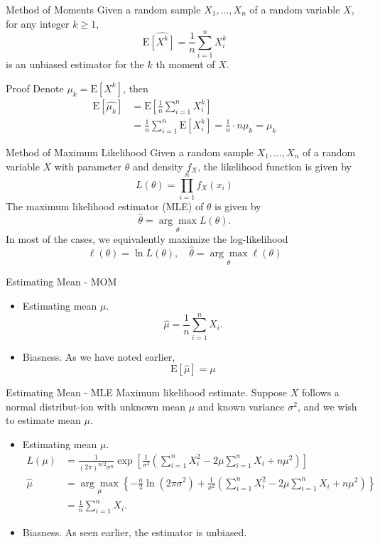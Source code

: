 \documentclass{beamer}
\begin{document}
\begin{frame}{Method of Moments}
Given a random sample $X_{1}, \ldots, X_{n}$ of a random variable $X$, for any integer $k \geq 1$,
$$
\mathrm{E}\widehat{\left[X^{k}\right]}=\frac{1}{n} \sum_{i=1}^{n} X_{i}^{k}
$$
is an unbiased estimator for the $k$ th moment of $X$.
\begin{block}{Proof}
Denote $\mu_{k}=\mathrm{E}\left[X^{k}\right]$, then
$$
\begin{aligned}
\mathrm{E}\left[\widehat{\mu_{k}}\right] &=\mathrm{E}\left[\frac{1}{n} \sum_{i=1}^{n} X_{i}^{k}\right] \\
&=\frac{1}{n} \sum_{i=1}^{n} \mathrm{E}\left[X_{i}^{k}\right]=\frac{1}{n} \cdot n \mu_{k}=\mu_{k}
\end{aligned}
$$
\end{block}
\end{frame}

\begin{frame}{Method of Maximum Likelihood}
Given a random sample $X_{1}, \ldots, X_{n}$ of a random variable $X$ with parameter $\theta$ and density $f_{X}$, the likelihood function is given by
$$
L(\theta)=\prod_{i=1}^{n} f_{X}\left(x_{i}\right)
$$
The maximum likelihood estimator (MLE) of $\theta$ is given by
$$
\widehat{\theta}=\underset{\theta}{\arg \max } L(\theta) .
$$
In most of the cases, we equivalently maximize the log-likelihood
$$
\ell(\theta)=\ln L(\theta), \quad \widehat{\theta}=\underset{\theta}{\arg \max } \ell(\theta)
$$
\end{frame}

\begin{frame}{Estimating Mean - MOM}
\begin{itemize}
\item Estimating mean $\mu$.
$$
\widehat{\mu}=\frac{1}{n} \sum_{i=1}^{n} X_{i} .
$$
\item Biasness. As we have noted earlier,
$$
\mathrm{E}[\widehat{\mu}]=\mu
$$
\end{itemize}
\end{frame}

\begin{frame}{Estimating Mean - MLE}
Maximum likelihood estimate. Suppose $X$ follows a normal distribut-ion with unknown mean $\mu$ and known variance $\sigma^{2}$, and we wish to estimate mean $\mu$.
\begin{itemize}
\item Estimating mean $\mu$.
$$
\begin{aligned}
L(\mu) &=\frac{1}{(2 \pi)^{n / 2} \sigma^{n}} \exp \left[\frac{1}{\sigma^{2}}\left(\sum_{i=1}^{n} X_{i}^{2}-2 \mu \sum_{i=1}^{n} X_{i}+n \mu^{2}\right)\right] \\
\widehat{\mu} &=\underset{\mu}{\arg \max }\left\{-\frac{n}{2} \ln \left(2 \pi \sigma^{2}\right)+\frac{1}{\sigma^{2}}\left(\sum_{i=1}^{n} X_{i}^{2}-2 \mu \sum_{i=1}^{n} X_{i}+n \mu^{2}\right)\right\} \\
&=\frac{1}{n} \sum_{i=1}^{n} X_{i} .
\end{aligned}
$$
\item Biasness. As seen earlier, the estimator is unbiased.
\end{itemize}
\end{frame}
\end{document}
